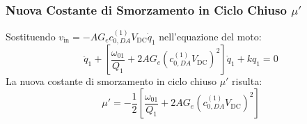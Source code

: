 \documentclass[11pt,a4paper]{article}
\begin{document}
\subsubsection{Nuova Costante di Smorzamento in Ciclo Chiuso \texorpdfstring{$\mu'$}{mu'}}
Sostituendo $v_{\text{in}} = -A G_e c_{0,DA}^{(1)} V_{\text{DC}} \dot{q}_1$ nell'equazione del moto:
\begin{equation}
    \ddot{q}_1 + \left[ \frac{\omega_{01}}{Q_1} + 2 A G_e \left( c_{0,DA}^{(1)} V_{\text{DC}} \right)^2 \right] \dot{q}_1 + k q_1 = 0
\end{equation}
La nuova costante di smorzamento in ciclo chiuso $\mu'$ risulta:
\begin{equation}
    \mu' = -\frac{1}{2} \left[ \frac{\omega_{01}}{Q_1} + 2 A G_e \left( c_{0,DA}^{(1)} V_{\text{DC}} \right)^2 \right]
    \label{eq:mu_closed_loop}
\end{equation}
\end{document}

